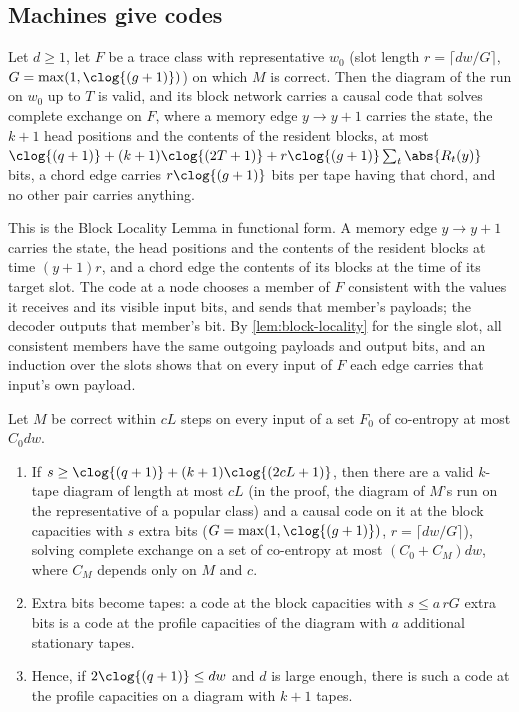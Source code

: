 \subsection{Machines give codes}

\begin{lemma}\label{lem:class-code}
Let $d\ge1$, let $F$ be a trace class with representative $w_0$ (slot length $r=\lceil dw/G\rceil$,
$G=\max(1,\clog{(g+1)})$) on which $M$ is correct. Then the diagram of the run on $w_0$ up to $T$ is
valid, and its block network carries a causal code that solves complete exchange on $F$, where a
memory edge $y\to y+1$ carries the state, the $k+1$ head positions and the contents of the resident
blocks, at most $\clog{(q+1)}+(k+1)\clog{(2T+1)}+r\clog{(g+1)}\sum_t\abs{R_t(y)}$ bits, a chord edge
carries $r\clog{(g+1)}$ bits per tape having that chord, and no other pair carries anything.
\end{lemma}

\begin{outline}
This is the Block Locality Lemma in functional form. A memory edge $y\to y+1$ carries the state, the head
positions and the contents of the resident blocks at time $(y+1)r$, and a chord edge the contents of its
blocks at the time of its target slot. The code at a node chooses a member of $F$ consistent with the values
it receives and its visible input bits, and sends that member's payloads; the decoder outputs that member's
bit. By \cref{lem:block-locality} for the single slot, all consistent members have the same outgoing payloads
and output bits, and an induction over the slots shows that on every input of $F$ each edge carries that
input's own payload.
\end{outline}

\begin{theorem}\label{thm:fast-codes}
Let $M$ be correct within $cL$ steps on every input of a set $F_0$ of co-entropy at most $C_0dw$.
\begin{enumerate}[label=(\alph*)]
\item If $s\ge\clog{(q+1)}+(k+1)\clog{(2cL+1)}$, then there are a valid $k$-tape diagram of length at most
$cL$ (in the proof, the diagram of $M$'s run on the representative of a popular class) and a causal code on
it at the block capacities with $s$ extra bits ($G=\max(1,\clog{(g+1)})$, $r=\lceil dw/G\rceil$), solving
complete exchange on a set of co-entropy at most $(C_0+C_M)dw$, where $C_M$ depends only on $M$ and $c$.
\item Extra bits become tapes: a code at the block capacities with $s\le a\,rG$ extra bits is a code at
the profile capacities of the diagram with $a$ additional stationary tapes.
\item Hence, if $2\clog{(q+1)}\le dw$ and $d$ is large enough, there is such a code at the profile
capacities on a diagram with $k+1$ tapes.
\end{enumerate}
\end{theorem}

